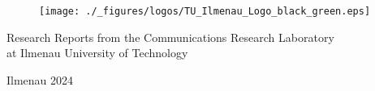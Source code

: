 \begin{titlepage}
    \pagestyle{empty}
    \centering \sffamily \Large
    
    \begin{flushright}
        \begin{figure}[ht]
            \flushright
            \texttt{[image: ./\_figures/logos/TU\_Ilmenau\_Logo\_black\_green.eps]}
        \end{figure}
    \end{flushright}
    
    \myrule 
    
    Research Reports from the Communications Research Laboratory \\
    at Ilmenau University of Technology
    
    
    \myrule 
    
    \vspace{3cm}
    
    {\Huge \bfseries \singlespacing \phdtitle \par}
    
    \vspace{3cm}
    
    {\LARGE \slshape \authorname}
    
    \vfill
    
    Ilmenau 2024

    \myrule

\end{titlepage}
